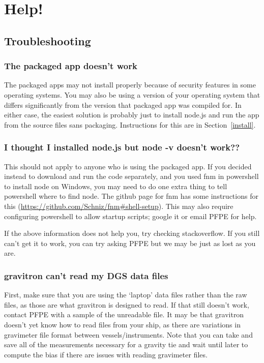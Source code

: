 \documentclass{pfpe-manual}
\begin{document}
\section{Help!}
\label{helphelp}

\subsection{Troubleshooting}

\subsubsection{The packaged app doesn't work}
The packaged apps may not install properly because of security features in some operating systems. You may also be using a version of your operating system that differs significantly from the version that packaged app was compiled for. In either case, the easiest solution is probably just to install node.js and run the app from the source files sans packaging. Instructions for this are in Section~\ref{install}.

\subsubsection{I thought I installed node.js but node -v doesn't work??}
This should not apply to anyone who is using the packaged app. If you decided instead to download and run the code separately, and you used fnm in powershell to install node on Windows, you may need to do one extra thing to tell powershell where to find node. The github page for fnm has some instructions for this (\url{https://github.com/Schniz/fnm#shell-setup}). This may also require configuring powershell to allow startup scripts; google it or email PFPE for help.

If the above information does not help you, try checking stackoverflow. If you still can't get it to work, you can try asking PFPE but we may be just as lost as you are.

\subsubsection{gravitron can't read my DGS data files}
First, make sure that you are using the `laptop' data files rather than the raw files, as those are what gravitron is designed to read. If that still doesn't work, contact PFPE with a sample of the unreadable file. It may be that gravitron doesn't yet know how to read files from your ship, as there are variations in gravimeter file format between vessels/instruments. Note that you can take and save all of the measurements necessary for a gravity tie and wait until later to compute the bias if there are issues with reading gravimeter files.
\end{document}
